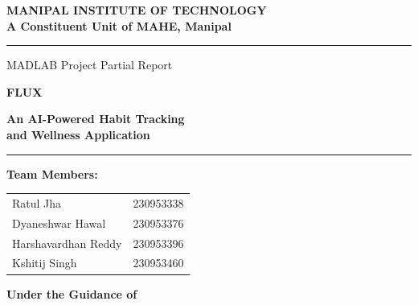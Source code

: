 \documentclass[12pt,a4paper]{article}
\begin{document}
\begin{titlepage}
    \centering
    \vspace*{1.5cm}


    {\large\bfseries MANIPAL INSTITUTE OF TECHNOLOGY\\
    \normalsize A Constituent Unit of MAHE, Manipal\par}

    \vspace{0.6cm}
    \rule{\linewidth}{1.5pt}\par
    \vspace{0.4cm}

    {\small MADLAB Project Partial Report\par}
    \vspace{0.3cm}

    {\Huge\bfseries\color{fluxpurple} FLUX\par}
    \vspace{0.2cm}
    {\LARGE\bfseries An AI-Powered Habit Tracking\\[4pt]
    and Wellness Application\par}

    \vspace{0.4cm}
    \rule{\linewidth}{1.5pt}\par
    \vspace{1.2cm}

    {\normalsize\bfseries Team Members:\par}
    \vspace{0.4cm}

    \begin{tabular}{ll}
        Ratul Jha           & 230953338 \\[4pt]
        Dyaneshwar Hawal    & 230953376 \\[4pt]
        Harshavardhan Reddy & 230953396 \\[4pt]
        Kshitij Singh       & 230953460
    \end{tabular}

    \vspace{1.2cm}

    {\normalsize\bfseries Under the Guidance of\par}
    \vspace{0.3cm}


\end{titlepage}
\end{document}
